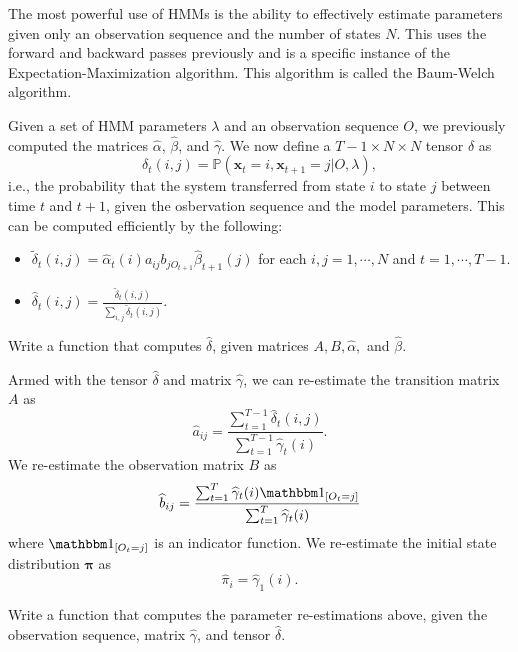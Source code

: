 

The most powerful use of HMMs is the ability to effectively estimate parameters given only an observation sequence and the number of states $N$. This uses the forward and backward passes previously and is a specific instance of the Expectation-Maximization algorithm. This algorithm is called the Baum-Welch algorithm.

Given a set of HMM parameters $\lambda$ and an observation sequence $O$, we previously computed the matrices $\widehat{\alpha}$, $\widehat{\beta}$, and $\widehat{\gamma}$. We now define a $T-1 \times N \times N$ tensor $\delta$ as 
$$\delta_{t}(i,j) = \mathbb{P}(\mathbf{x}_{t} = i, \mathbf{x}_{t+1} = j | O, \lambda),$$ i.e., the probability that the system transferred from state $i$ to state $j$ between time $t$ and $t+1$, given the osbervation sequence and the model parameters. This can be computed efficiently by the following:
\begin{itemize}
 \item $\tilde{\delta}_{t}(i,j) = \widehat{\alpha}_{t}(i)a_{ij} b_{jO_{t+1}} \widehat{\beta}_{t+1}(j)$ for each $i,j = 1, \cdots, N$ and $t = 1, \cdots, T-1$.
 \item $\widehat{\delta}_{t}(i,j) = \frac{\tilde{\delta}_{t}(i,j)}{\sum_{i,j} \tilde{\delta}_{t}(i,j)}$.
\end{itemize}

\begin{problem}
Write a function that computes $\widehat{\delta}$, given matrices $A, B, \widehat{\alpha},$ and $\widehat{\beta}$.
\end{problem}

Armed with the tensor $\widehat{\delta}$ and matrix $\widehat{\gamma}$, we can re-estimate the transition matrix $A$ as
$$\widehat{a}_{ij} = \frac{\sum_{t=1}^{T-1} \widehat{\delta}_{t}(i,j)}{\sum_{t=1}^{T-1} \widehat{\gamma}_{t}(i)}.$$
We re-estimate the observation matrix $B$ as 
$$\widehat{b}_{ij} = \frac{\sum_{t=1}^{T} \widehat{\gamma}_{t}(i)\indicator{O_{t} = j}}{\sum_{t=1}^{T} \widehat{\gamma}_{t}(i)}$$
 where $\indicator{O_{t} = j}$ is an indicator function. We re-estimate the initial state distribution $\mathbf{\pi}$ as 
$$\widehat{\pi}_{i} = \widehat{\gamma}_{1}(i).$$

\begin{problem}
Write a function that computes the parameter re-estimations above, given the observation sequence, matrix $\widehat{\gamma}$, and tensor $\widehat{\delta}$.
\end{problem}

